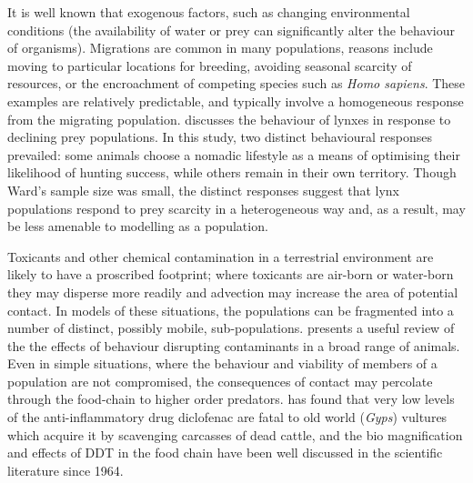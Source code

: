 It is well known that exogenous factors, such as changing
environ\-mental conditions (\eg the availability of water or prey
can significantly alter the behaviour of organisms).  Migrations are
common in many populations, reasons include moving to particular
locations for breeding, avoiding seasonal scarcity of resources, or
the encroachment of competing species such as \textit{Homo sapiens}.
These examples are relatively predictable, and typically involve a
homogeneous response from the migrating population.
\Cite{ward1985behavioural} discusses the behaviour of
lynxes in response to declining prey populations. In this study, two
distinct behavioural responses prevailed: some animals choose a
nomadic lifestyle as a means of optimising their likelihood of hunting
success, while others remain in their own territory.  Though Ward's
sample size was small, the distinct responses suggest that lynx
populations respond to prey scarcity in a heterogeneous way and, as a
result, may be less amenable to modelling as a population.

Toxicants and other chemical contamination in a terrestrial
environment are likely to have a proscribed footprint; where toxicants
are air-born or water-born they may disperse more readily and
advection may increase the area of potential contact.  In models of
these situations, the populations can be fragmented into a number of
distinct, possibly mobile, sub-populations. \Cite{zala2004abnormal}
presents a useful review of the the effects of behaviour disrupting
contaminants in a broad range of animals.  Even in simple situations,
where the behaviour and viability of members of a population are not
compromised, the consequences of contact may percolate through the
food-chain to higher order predators. \Cite{swan2006toxicity} has
found that very low levels of the anti-inflammatory drug diclofenac
are fatal to old world (\textit{Gyps}) vultures which acquire it by
scavenging carcasses of dead cattle, and the bio magnification and
effects of DDT in the food chain have been well discussed in the
scientific literature since 1964.

